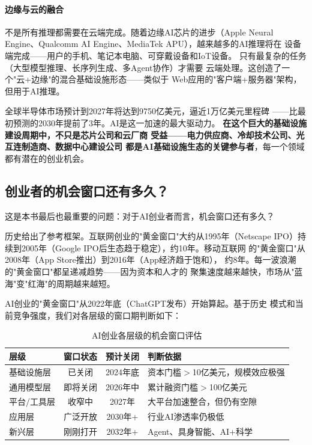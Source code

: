 \paragraph{边缘与云的融合}
不是所有推理都需要在云端完成。随着边缘AI芯片的进步（Apple Neural
Engine、Qualcomm AI Engine、MediaTek APU），越来越多的AI推理将在
设备端完成——用户的手机、笔记本电脑、可穿戴设备和IoT设备。
只有最复杂的任务（大型模型推理、长序列生成、多Agent协作）才需要
云端处理。这创造了一个"云+边缘"的混合基础设施形态——类似于
Web应用的"客户端+服务器"架构，但用于AI推理。

全球半导体市场预计到2027年将达到9750亿美元，逼近1万亿美元里程碑
——比最初预测的2030年提前了3年。AI是这一加速的最大驱动力。
\textbf{在这个巨大的基础设施建设周期中，不只是芯片公司和云厂商
受益——电力供应商、冷却技术公司、光互连制造商、数据中心建设公司
都是AI基础设施生态的关键参与者}，每一个领域都有潜在的创业机会。


\subsection{创业者的机会窗口还有多久？}
\label{subsec:outlook-window-of-opportunity}

这是本书最后也最重要的问题：对于AI创业者而言，机会窗口还有多久？

历史给出了参考框架。互联网创业的"黄金窗口"大约从1995年（Netscape
IPO）持续到2005年（Google IPO后生态趋于稳定），约10年。移动互联网
的"黄金窗口"从2008年（App Store推出）到2016年（App经济趋于饱和），
约8年。每一波浪潮的"黄金窗口"都呈递减趋势——因为资本和人才的
聚集速度越来越快，市场从"蓝海"变"红海"的周期越来越短。

AI创业的"黄金窗口"从2022年底（ChatGPT发布）开始算起。基于历史
模式和当前竞争强度，我们对各层级的窗口期判断如下：

\begin{table}[htbp]
\centering
\caption{AI创业各层级的机会窗口评估}
\label{tab:opportunity-windows}
\small
\begin{tabularx}{\textwidth}{lccX}
\toprule
\rowcolor{figLightGray}
\textbf{层级} & \textbf{窗口状态} & \textbf{预计关闭} & \textbf{判断依据} \\
\midrule
基础设施层 & 已关闭 & 2024年底 & 资本门槛$>$10亿美元，规模效应极强 \\
通用模型层 & 即将关闭 & 2026年中 & 累计融资门槛$>$100亿美元 \\
平台/工具层 & 收窄中 & 2027年 & 大平台加速整合，但仍有空隙 \\
应用层 & 广泛开放 & 2030年+ & 行业AI渗透率仍极低 \\
新兴层 & 刚刚打开 & 2032年+ & Agent、具身智能、AI+科学 \\
\bottomrule
\end{tabularx}
\end{table}

